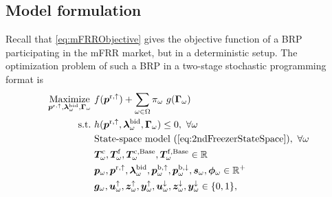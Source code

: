 \documentclass[11pt,a4paper]{article}
\begin{document}
\subsection{Model formulation}
Recall that \eqref{eq:mFRRObjective} gives the objective function of a BRP participating in the mFRR market, but in a deterministic setup.  The optimization problem of such a BRP in a two-stage stochastic programming format is
%
\begin{subequations}\label{P1:compact_model}
    \begin{align}
        \underset{\bm{p}^{\rm{r},\uparrow}, \bm{\lambda}_{\omega}^{\rm{bid}}, \bm{\Gamma}_{\omega}}{\text{Maximize}} \  & f(\bm{p}^{\rm{r},\uparrow}) + \sum_{\omega \in \Omega} \pi_{\omega} \ g(\bm{\Gamma}_{\omega}) \label{P1:eq1}
        \\
        \text{s.t.} \                                                                                                   & h(\bm{p}^{\rm{r},\uparrow}, \bm{\lambda}_{\omega}^{\rm{bid}}, \bm{\Gamma}_{\omega}) \leq 0, \ \forall{\omega}\label{P1:eq2}                                                                                                 \\
        \                                                                                                               & \text{State-space model } (\ref{eq:2ndFreezerStateSpace}), \ \forall{\omega} \label{P1:eq3}
        \\
        \                                                                                                               & \bm{T}_{\omega}^{\rm{c}}, \bm{T}_{\omega}^{\rm{f}},  \bm{T}_{\omega}^{\rm{c,\text{Base}}}, \bm{T}_{\omega}^{\rm{f,\text{Base}}}\in \mathbb{R}  \label{P1:eq4}
        \\
        \                                                                                                               & \bm{p}_{\omega}, \bm{p}^{\rm{r},\uparrow}, \bm{\lambda}_{\omega}^{\rm{bid}}, \bm{p}_{\omega}^{\rm{b},\uparrow}, \bm{p}_{\omega}^{\rm{b},\downarrow}, \bm{s}_{\omega},  \bm{\phi}_{\omega}\in \mathbb{R}^{+}  \label{P1:eq5}
        \\
        \                                                                                                               & \bm{g}_{\omega}, \bm{u}^{\uparrow}_{\omega}, \bm{z}^{\uparrow}_{\omega}, \bm{y}^{\uparrow}_{\omega}, \bm{u}^{\downarrow}_{\omega}, \bm{z}^{\downarrow}_{\omega}, \bm{y}^{\downarrow}_{\omega} \in \{0,1\},  \label{P1:eq6}
    \end{align}
\end{subequations}
\end{document}
